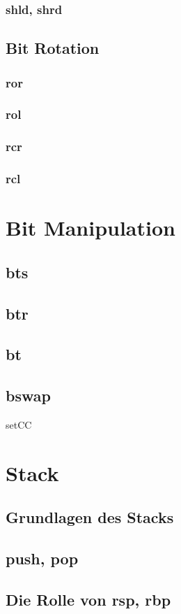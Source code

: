\documentclass[12pt, a4paper, utf8]{book}
\begin{document}
\subsection{shld, shrd}
\section{Bit Rotation}
\subsection{ror}
\subsection{rol}
\subsection{rcr}
\subsection{rcl}
\chapter{Bit Manipulation}
\section{bts}
\section{btr}
\section{bt}
\section{bswap}
    setCC
\chapter{Stack}
\section{Grundlagen des Stacks}
\section{push, pop}
\section{Die Rolle von rsp, rbp}
\end{document}
